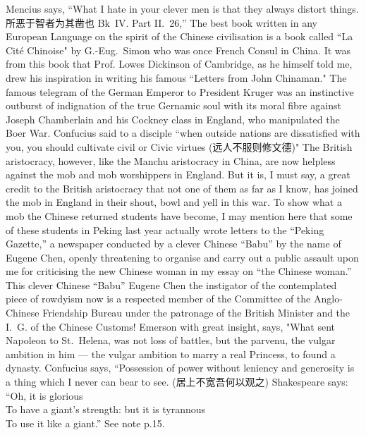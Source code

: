 
\begin{thebibliography}{30}
     Mencius says, ``What I hate in your clever men is that they always distort things. 所恶于智者为其凿也 Bk~IV. Part II.~26,''
     The best book written in any European Language on the spirit of the Chinese civilisation is a book called ``La Cit\'e Chinoise" by G.-Eug.~Simon who was once French Consul in China. It was from this book that Prof. Lowes Dickinson of Cambridge, as he himself told me, drew his inspiration in writing his famous ``Letters from John Chinaman."
     The famous telegram of the German Emperor to President Kruger was an instinctive outburst of indignation of the true Gernamic soul with its moral fibre against Joseph Chamberlain and his Cockney class in England, who manipulated the Boer War.
     Confucius said to a disciple ``when outside nations are dissatisfied with you, you should cultivate civil or Civic virtues (远人不服则修文德)" The British aristocracy, however, like the Manchu aristocracy in China, are now helpless against the mob and mob worshippers in England. But it is, I must say, a great credit to the British aristocracy that not one of them as far as I know, has joined the mob in England in their shout, bowl and yell in this war.
     To show what a mob the Chinese returned students have become, I may mention here that some of these students in Peking last year actually wrote letters to the ``Peking Gazette,'' a newspaper conducted by a clever Chinese ``Babu'' by the name of Eugene Chen, openly threatening to organise and carry out a public assault upon me for criticising the new Chinese woman in my essay on ``the Chinese woman.'' This clever Chinese ``Babu'' Eugene Chen the instigator of the contemplated piece of rowdyism now is a respected member of the Committee of the Anglo-Chinese Friendship Bureau under the patronage of the British Minister and the I.~G. of the Chinese Customs!
     Emerson with great insight, says, "What sent Napoleon to St.~Helena, was not loss of battles, but the parvenu, the vulgar ambition in him --- the vulgar ambition to marry a real Princess, to found a dynasty.
     Confucius says, ``Possession of power without leniency and generosity is a thing which I never can bear to see. (居上不宽吾何以观之) Shakespeare says: \\``Oh, it is glorious\\ To have a giant's strength: but it is tyrannous \\ To use it like a giant.'' See note p.15.

\end{thebibliography}
